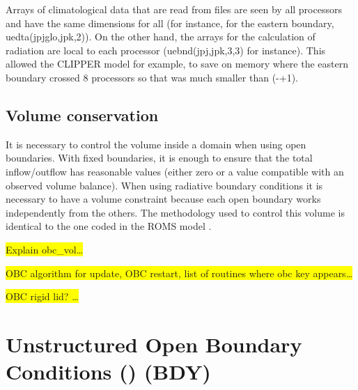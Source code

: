 Arrays of climatological data that are read from files are seen by all processors 
and have the same dimensions for all (for instance, for the eastern boundary, 
uedta(jpjglo,jpk,2)). On the other hand, the arrays for the calculation of radiation 
are local to each processor (uebnd(jpj,jpk,3,3) for instance).  This allowed the 
CLIPPER model for example, to save on memory where the eastern boundary 
crossed 8 processors so that  was much smaller than (-+1). 

\subsection{Volume conservation}
\label{OBC_vol}

It is necessary to control the volume inside a domain when using open boundaries. 
With fixed boundaries, it is enough to ensure that the total inflow/outflow has 
reasonable values (either zero or a value compatible with an observed volume 
balance). When using radiative boundary conditions it is necessary to have a 
volume constraint because each open boundary works independently from the 
others. The methodology used to control this volume is identical to the one 
coded in the ROMS model \citep{Marchesiello2001}.


\colorbox{yellow}{Explain obc\_vol{\ldots}}

\colorbox{yellow}{OBC algorithm for update, OBC restart, list of routines where obc key appears{\ldots}}

\colorbox{yellow}{OBC rigid lid? {\ldots}}

\section{Unstructured Open Boundary Conditions () (BDY)}
\label{LBC_bdy}


